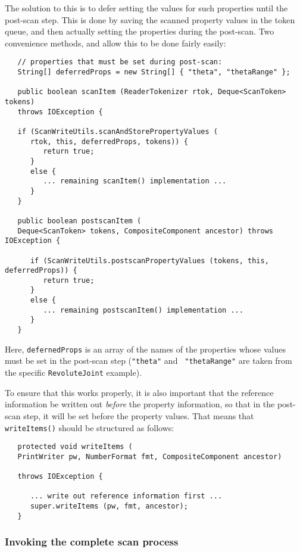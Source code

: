 \documentclass{article}
\begin{document}
The solution to this is to defer setting the values for such
properties until the post-scan step. This is done by saving the
scanned property values in the token queue, and then actually setting
the properties during the post-scan. Two convenience methods,
and 
allow this to be done fairly easily:
\begin{lstlisting}
   // properties that must be set during post-scan:
   String[] deferredProps = new String[] { "theta", "thetaRange" };

   public boolean scanItem (ReaderTokenizer rtok, Deque<ScanToken> tokens)
   throws IOException {

   if (ScanWriteUtils.scanAndStorePropertyValues (
      rtok, this, deferredProps, tokens)) {
         return true;
      }
      else {
         ... remaining scanItem() implementation ...
      }
   }

   public boolean postscanItem (
   Deque<ScanToken> tokens, CompositeComponent ancestor) throws IOException {

      if (ScanWriteUtils.postscanPropertyValues (tokens, this, deferredProps)) {
         return true;
      }
      else {
         ... remaining postscanItem() implementation ...
      }
   }
\end{lstlisting}
Here, {\tt defernedProps} is an array of the names of the properties
whose values must be set in the post-scan step ({\tt "theta"} and {\tt
"thetaRange"} are taken from the specific {\tt RevoluteJoint} example).

To ensure that this works properly, it is also important that the
reference information be written out {\it before} the property
information, so that in the post-scan step, it will be set before the
property values.  That means that {\tt writeItems()} should be
structured as follows:
\begin{lstlisting}
   protected void writeItems (
   PrintWriter pw, NumberFormat fmt, CompositeComponent ancestor) 

   throws IOException {

      ... write out reference information first ...
      super.writeItems (pw, fmt, ancestor);
   }
\end{lstlisting}

\subsubsection{Invoking the complete scan process}
\end{document}
